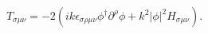 \begin{equation}\label{4.9}
T_{\sigma\mu\nu}=-2(ik\epsilon_{\sigma\rho\mu\nu}\phi
^\dagger\partial^\rho\phi + k^2|\phi|^2 H_{\sigma\mu\nu}).
\label{35}
\end{equation}

